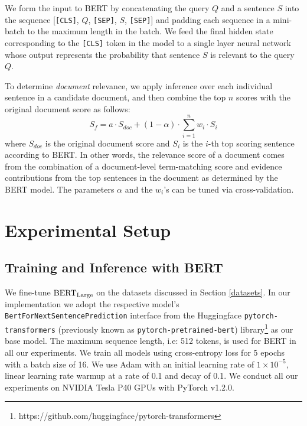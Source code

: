 We form the input to BERT by concatenating the query $Q$ and a sentence $S$ into the sequence [\texttt{[CLS]}, $Q$, \texttt{[SEP]}, $S$, \texttt{[SEP]}] and padding each sequence in a mini-batch to the maximum length in the batch.
We feed the final hidden state corresponding to the \texttt{[CLS]} token in the model to a single layer neural network whose output represents the probability that sentence $S$ is relevant to the query $Q$.

To determine {\it document} relevance, we apply inference over each individual sentence in a candidate document, and then combine the top $ n $ scores with the original document score as follows:
\begin{equation} \label{eq:1}
S_f = a \cdot S_{doc}  + (1 - \alpha) \cdot \sum_{i = 1}^n w_i \cdot S_i
\end{equation}
\noindent where $ S_{doc} $ is the original document score and $ S_i $ is the $ i $-th top scoring sentence according to BERT.
In other words, the relevance score of a document comes from the combination of a document-level term-matching score and evidence contributions from the top sentences in the document as determined by the BERT model.
The parameters $ \alpha $ and the $ w_i $'s can be tuned via cross-validation.


\section{Experimental Setup}

\subsection{Training and Inference with BERT}

We fine-tune $ \textrm{BERT}_{\textrm{\scriptsize Large}} $ \cite{devlin2018bert} on the datasets discussed in Section \ref{datasets}.
In our implementation we adopt the respective model's \texttt{BertForNextSentencePrediction} interface from the Huggingface \texttt{pytorch-transformers} (previously known as \texttt{pytorch-pretrained-bert}) library\footnote{https://github.com/huggingface/pytorch-transformers} as our base model.
The maximum sequence length, i.e: 512 tokens, is used for BERT in all our experiments.
We train all models using cross-entropy loss for 5 epochs with a batch size of 16.
We use Adam \cite{kingma2014adam} with an initial learning rate of $ 1 \times 10^{-5}$, linear learning rate warmup at a rate of 0.1 and decay of 0.1.
We conduct all our experiments on NVIDIA Tesla P40 GPUs with PyTorch v1.2.0.

